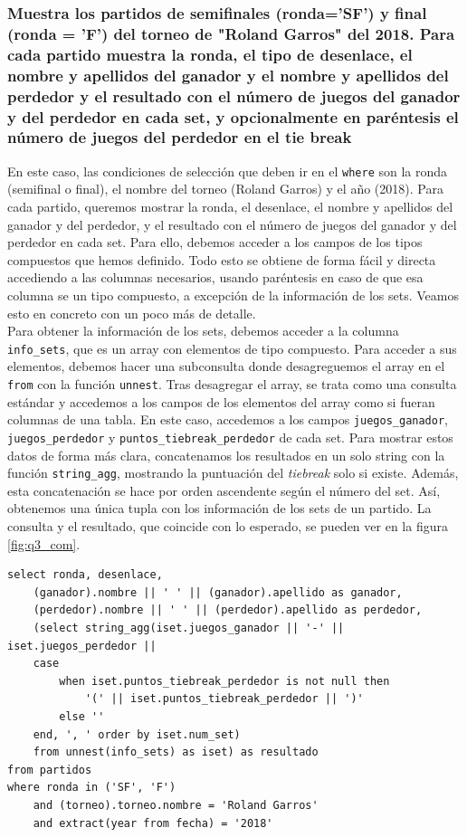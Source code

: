 \subsubsection{Muestra los partidos de semiﬁnales (ronda='SF') y ﬁnal (ronda = 'F') del torneo de "Roland Garros" del 2018. Para cada partido muestra la ronda, el tipo de desenlace, el nombre y apellidos del ganador y el nombre y apellidos del perdedor y el resultado con el número de juegos del ganador y del perdedor en cada set, y opcionalmente en paréntesis el número de juegos del perdedor en el tie break}

En este caso, las condiciones de selección que deben ir en el \texttt{where} son la ronda (semifinal o final), el nombre del torneo (Roland Garros) y el año (2018). Para cada partido, queremos mostrar la ronda, el desenlace, el nombre y apellidos del ganador y del perdedor, y el resultado con el número de juegos del ganador y del perdedor en cada set. Para ello, debemos acceder a los campos de los tipos compuestos que hemos definido. Todo esto se obtiene de forma fácil y directa accediendo a las columnas necesarios, usando paréntesis en caso de que esa columna se un tipo compuesto, a excepción de la información de los sets. Veamos esto en concreto con un poco más de detalle. \\

Para obtener la información de los sets, debemos acceder a la columna \texttt{info\_sets}, que es un array con elementos de tipo compuesto. Para acceder a sus elementos, debemos hacer una subconsulta donde desagreguemos el array en el \texttt{from} con la función \texttt{unnest}. Tras desagregar el array, se trata como una consulta estándar y accedemos a los campos de los elementos del array como si fueran columnas de una tabla. En este caso, accedemos a los campos \texttt{juegos\_ganador}, \texttt{juegos\_perdedor} y \texttt{puntos\_tiebreak\_perdedor} de cada set. Para mostrar estos datos de forma más clara, concatenamos los resultados en un solo string con la función \texttt{string\_agg}, mostrando la puntuación del \textit{tiebreak} solo si existe. Además, esta concatenación se hace por orden ascendente según el número del set. Así, obtenemos una única tupla con los información de los sets de un partido. La consulta y el resultado, que coincide con lo esperado, se pueden ver en la figura \ref{fig:q3_com}.

\begin{verbatim}
select ronda, desenlace, 
	(ganador).nombre || ' ' || (ganador).apellido as ganador,
	(perdedor).nombre || ' ' || (perdedor).apellido as perdedor, 
	(select string_agg(iset.juegos_ganador || '-' || iset.juegos_perdedor ||
	case
		when iset.puntos_tiebreak_perdedor is not null then 
			'(' || iset.puntos_tiebreak_perdedor || ')'
		else ''
	end, ', ' order by iset.num_set) 
	from unnest(info_sets) as iset) as resultado
from partidos
where ronda in ('SF', 'F')
	and (torneo).torneo.nombre = 'Roland Garros'
	and extract(year from fecha) = '2018'
\end{verbatim}

